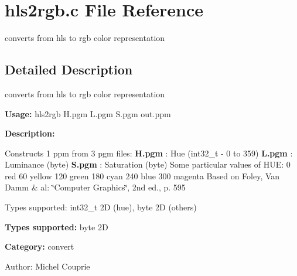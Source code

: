 \section{hls2rgb.c File Reference}
\label{hls2rgb_8c}
converts from hls to rgb color representation 



\subsection{Detailed Description}
converts from hls to rgb color representation 

{\bf Usage:} hls2rgb H.pgm L.pgm S.pgm out.ppm

{\bf Description:}

Constructs 1 ppm from 3 pgm files: {\bf H.pgm} : Hue (int32\_\-t - 0 to 359) {\bf L.pgm} : Luminance (byte) {\bf S.pgm} : Saturation (byte) Some particular values of HUE: 0 red 60 yellow 120 green 180 cyan 240 blue 300 magenta Based on Foley, Van Damm \& al: \char`\"{}Computer Graphics\char`\"{}, 2nd ed., p. 595

Types supported: int32\_\-t 2D (hue), byte 2D (others)

{\bf Types supported:} byte 2D

{\bf Category:} convert

\begin{Desc}
\item[Author:]Michel Couprie \end{Desc}
